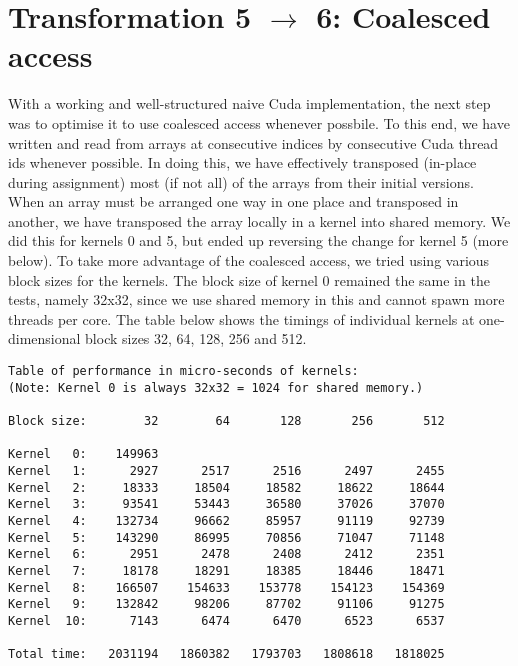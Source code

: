 \section{Transformation 5 $\rightarrow$ 6: Coalesced access}

With a working and well-structured naive Cuda implementation, the next step was to optimise it to use coalesced access whenever possbile. To this end, we have written and read from arrays at consecutive indices by consecutive Cuda thread ids whenever possible. In doing this, we have effectively transposed (in-place during assignment) most (if not all) of the arrays from their initial versions.\n
When an array must be arranged one way in one place and transposed in another, we have transposed the array locally in a kernel into shared memory. We did this for kernels 0 and 5, but ended up reversing the change for kernel 5 (more below).\n
To take more advantage of the coalesced access, we tried using various block sizes for the kernels. The block size of kernel 0 remained the same in the tests, namely 32x32, since we use shared memory in this and cannot spawn more threads per core. The table below shows the timings of individual kernels at one-dimensional block sizes 32, 64, 128, 256 and 512.

\begin{verbatim}
Table of performance in micro-seconds of kernels:
(Note: Kernel 0 is always 32x32 = 1024 for shared memory.)

Block size:        32        64       128       256       512

Kernel   0:    149963
Kernel   1:      2927      2517      2516      2497      2455
Kernel   2:     18333     18504     18582     18622     18644
Kernel   3:     93541     53443     36580     37026     37070
Kernel   4:    132734     96662     85957     91119     92739
Kernel   5:    143290     86995     70856     71047     71148
Kernel   6:      2951      2478      2408      2412      2351
Kernel   7:     18178     18291     18385     18446     18471
Kernel   8:    166507    154633    153778    154123    154369
Kernel   9:    132842     98206     87702     91106     91275
Kernel  10:      7143      6474      6470      6523      6537

Total time:   2031194   1860382   1793703   1808618   1818025
\end{verbatim}


